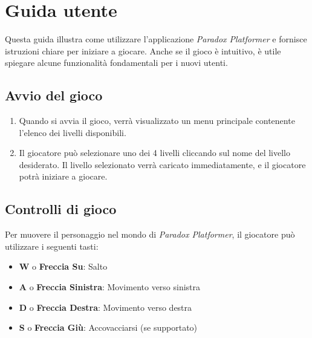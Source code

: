 \documentclass[a4paper,12pt]{report}
\begin{document}
	\appendix
	\chapter{Guida utente}
	
	Questa guida illustra come utilizzare l’applicazione \textit{Paradox Platformer} e fornisce istruzioni chiare per iniziare a giocare. Anche se il gioco è intuitivo, è utile spiegare alcune funzionalità fondamentali per i nuovi utenti.
	
	\section{Avvio del gioco}
	
	\begin{enumerate}
		\item Quando si avvia il gioco, verrà visualizzato un menu principale contenente l’elenco dei livelli disponibili.
		\item Il giocatore può selezionare uno dei 4 livelli cliccando sul nome del livello desiderato. Il livello selezionato verrà caricato immediatamente, e il giocatore potrà iniziare a giocare.
	\end{enumerate}
	
	\section{Controlli di gioco}
	
	Per muovere il personaggio nel mondo di \textit{Paradox Platformer}, il giocatore può utilizzare i seguenti tasti:
	
	\begin{itemize}
		\item \textbf{W} o \textbf{Freccia Su}: Salto
		\item \textbf{A} o \textbf{Freccia Sinistra}: Movimento verso sinistra
		\item \textbf{D} o \textbf{Freccia Destra}: Movimento verso destra
		\item \textbf{S} o \textbf{Freccia Giù}: Accovacciarsi (se supportato)
	\end{itemize}
	
	
	
	
\end{document}
